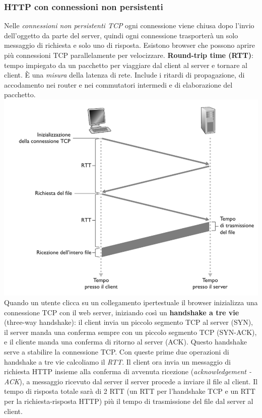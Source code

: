 \subsubsection*{HTTP con connessioni non persistenti}
Nelle \textit{connessioni non persistenti TCP} ogni connessione viene chiusa dopo l'invio dell'oggetto da parte del server, quindi ogni connessione trasporterà un solo messaggio di richiesta e solo uno di risposta.
Esistono browser che possono aprire più connessioni TCP parallelamente per velocizzare.
\textbf{Round-trip time (RTT)}: tempo impiegato da un pacchetto per viaggiare dal client al server e tornare al client. È una \textit{misura} della latenza di rete. Include i ritardi di propagazione, di accodamento nei router e nei commutatori intermedi e di elaborazione del pacchetto. \\ 
\includegraphics[width=\textwidth]{./img/rtt.png}
Quando un utente clicca su un collegamento ipertestuale il browser inizializza una connessione TCP con il web server, iniziando così un \textbf{handshake a tre vie} (three-way handshake): il client invia un piccolo segmento TCP al server (SYN), il server manda una conferma sempre con un piccolo segmento TCP (SYN-ACK), e il cliente manda una conferma di ritorno al server (ACK). Questo handshake serve a stabilire la connessione TCP.
Con queste prime due operazioni di handshake a tre vie calcoliamo il \textit{RTT}.
Il client ora invia un messaggio di richiesta HTTP insieme alla conferma di avvenuta ricezione (\textit{acknowledgement - ACK}), a messaggio ricevuto dal server il server procede a inviare il file al client. Il tempo di risposta totale sarà di 2 RTT (un RTT per l'handshake TCP e un RTT per la richiesta-risposta HTTP) più il tempo di trasmissione del file dal server al client.

